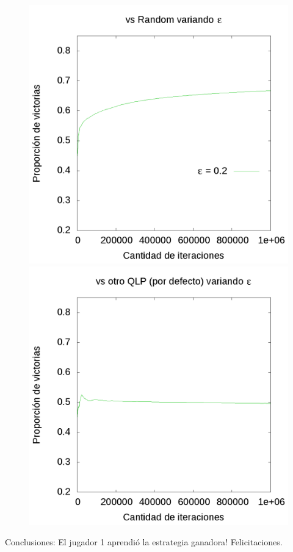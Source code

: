 \documentclass[10pt, a4paper]{article}
\begin{document}
\begin{figure}[h]
\begin{minipage}[c]{1\textwidth}
  \end{minipage}
  \begin{minipage}[c]{1\textwidth}
	\includegraphics[scale=0.2]{EpsilonR.png}
	\includegraphics[scale=0.2]{EpsilonQ.png}
  \end{minipage}
\end{figure}

Conclusiones: El jugador 1 aprendió la estrategia ganadora! Felicitaciones.
\end{document}

